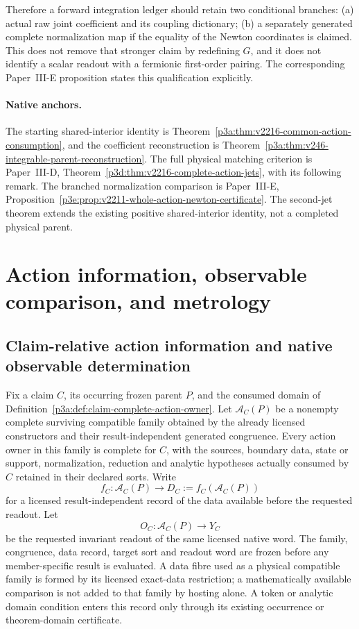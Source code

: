 \documentclass[12pt,a4paper]{article}
\begin{document}
Therefore a forward integration ledger should retain two conditional
branches: (a) actual raw joint coefficient and its coupling dictionary;
(b) a separately generated complete normalization map if the equality
of the Newton coordinates is claimed.  This does not remove that stronger
claim by redefining $G$, and it does not identify a scalar readout with
a fermionic first-order pairing.  The corresponding Paper~III-E proposition states this qualification explicitly.

\paragraph{Native anchors.}
The starting shared-interior identity is
Theorem~\ref{p3a:thm:v2216-common-action-consumption}, and the coefficient
reconstruction is Theorem~\ref{p3a:thm:v246-integrable-parent-reconstruction}.
The full physical matching criterion is Paper~III-D,
Theorem~\ref{p3d:thm:v2216-complete-action-jets}, with its following remark.
The branched normalization comparison is Paper~III-E,
Proposition~\ref{p3e:prop:v2211-whole-action-newton-certificate}.
The second-jet theorem extends the existing
positive shared-interior identity, not a completed physical parent.

\section{Action information, observable comparison, and metrology}
\label{paper3a:sec:organized-readouts}
\subsection{Claim-relative action information and native observable determination}
\label{p3a:sec:v188-claim-relative-observable}

\begin{definition}
\label{p3a:def:v188-native-claim-data}
Fix a claim $C$, its occurring frozen parent $P$, and the consumed domain
of Definition~\ref{p3a:def:claim-complete-action-owner}.  Let
$\mathcal A_C(P)$ be a nonempty complete surviving compatible family
obtained by the already licensed constructors and their result-independent
generated congruence.  Every action owner in this family is complete for
$C$, with the sources, boundary data, state or support, normalization,
reduction and analytic hypotheses actually consumed by $C$ retained in
their declared sorts.  Write
\[
 f_C:\mathcal A_C(P)\longrightarrow D_C:=f_C(\mathcal A_C(P))
\]
for a licensed result-independent record of the data available before the
requested readout.  Let
\[
 O_C:\mathcal A_C(P)\longrightarrow Y_C
\]
be the requested invariant readout of the same licensed native word.
The family, congruence, data record, target sort and readout word are frozen
before any member-specific result is evaluated.  A data fibre used as a
physical compatible family is formed by its licensed exact-data restriction;
a mathematically available comparison is not added to that family by hosting
alone.  A token or analytic domain condition enters this record only through
its existing occurrence or theorem-domain certificate.
\end{definition}
\end{document}
